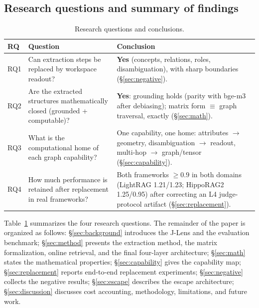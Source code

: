 \subsection{Research questions and summary of findings}

\begin{table}[t]
\centering
\caption{Research questions and conclusions.}
\label{tab:rq}
\begin{tabular}{@{}lp{4.8cm}p{6.2cm}@{}}
\toprule
RQ & Question & Conclusion \\
\midrule
RQ1 & Can extraction steps be replaced by workspace readout? &
\textbf{Yes} (concepts, relations, roles, disambiguation), with sharp
boundaries (\S\ref{sec:negative}). \\
RQ2 & Are the extracted structures mathematically closed (grounded +
computable)? & \textbf{Yes}: grounding holds (parity with bge-m3 after
debiasing); matrix form $\equiv$ graph traversal, exactly
(\S\ref{sec:math}). \\
RQ3 & What is the computational home of each graph capability? &
One capability, one home: attributes $\to$ geometry, disambiguation $\to$
readout, multi-hop $\to$ graph/tensor (\S\ref{sec:capability}). \\
RQ4 & How much performance is retained after replacement in real frameworks? &
Both frameworks $\geq 0.9$ in both domains (LightRAG 1.21/1.23; HippoRAG2
1.25/0.95) after correcting an L4 judge-protocol artifact
(\S\ref{sec:replacement}). \\
\bottomrule
\end{tabular}
\end{table}

Table~\ref{tab:rq} summarizes the four research questions. The remainder of the
paper is organized as follows: \S\ref{sec:background} introduces the J-Lens and
the evaluation benchmark; \S\ref{sec:method} presents the extraction method,
the matrix formalization, online retrieval, and the final four-layer
architecture; \S\ref{sec:math} states the mathematical properties;
\S\ref{sec:capability} gives the capability map; \S\ref{sec:replacement}
reports end-to-end replacement experiments; \S\ref{sec:negative} collects the
negative results; \S\ref{sec:escape} describes the escape architecture;
\S\ref{sec:discussion} discusses cost accounting, methodology, limitations, and
future work.
